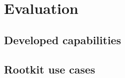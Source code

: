 \chapter{Evaluation} \label{chapter:evaluation}
\section{Developed capabilities}
\section{Rootkit use cases} \label{section:use_cases}